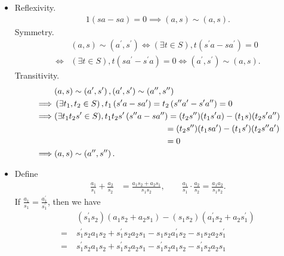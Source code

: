 \begin{solution}
    \begin{itemize}
        \item Reflexivity. 
        \begin{align*}
            1(sa-sa)=0\implies (a,s)\sim(a,s).
        \end{align*}
        Symmetry.
        \begin{align*}
            &(a, s) \sim\left(a^{\prime}, s^{\prime}\right) \Longleftrightarrow\left(\exists t \in S\right), t\left(s^{\prime} a-s a^{\prime}\right)=0 \\
            \iff&  (\exists t \in S), t\left(s a^{\prime}-s^{\prime} a\right)=0\iff \left(a^{\prime}, s^{\prime}\right)  \sim (a, s).
        \end{align*}
        Transitivity.
        \begin{align*}
            &(a, s) \sim\left(a^{\prime}, s^{\prime}\right) ,\left(a^{\prime}, s^{\prime}\right) \sim \left(a'', s''\right)\\
            \implies &\left(\exists t_1,t_2 \in S\right), t_1\left(s^{\prime} a-s a^{\prime}\right)=t_2\left(s'' a'-s' a''\right)=0  \\
            \implies & (\exists t_1t_2s' \in S), t_1t_2s'\left(s'' a-s a''\right)=(t_2s'')(t_1s'a)-(t_1s)(t_2s'a'')\\
            &\hspace{13.25em}=(t_2s'')(t_1sa')-(t_1s')(t_2s'' a')\\
            &\hspace{13.25em}=0\\
            \implies & (a, s)\sim \left(a'', s''\right) .
        \end{align*}
        \item Define
        \begin{align*}
            \frac{a_1}{s_1}+\frac{a_2}{s_2}&=\frac{a_1s_2+a_2s_1}{s_1s_2},\qquad \frac{a_1}{s_1}\cdot\frac{a_2}{s_2}=\frac{a_1a_2}{s_1s_2}.
        \end{align*}
        If $\frac{a_1}{s_1} = \frac{a_1^\prime}{s_1^\prime}$, then we have
        \begin{align*}
            &\;(s_1^\prime s_2)(a_1s_2+a_2s_1)-(s_1s_2)(a_1^\prime s_2+a_2s_1^\prime)\\
            =&\;s_1^\prime s_2a_1s_2+s_1^\prime s_2a_2s_1-s_1s_2a_1^\prime s_2-s_1s_2a_2s_1^\prime\\
            =&\;s_1^\prime s_2a_1s_2+s_1^\prime s_2a_2s_1-s_1^\prime s_2a_1 s_2-s_1^\prime s_2a_2s_1\\

\end{align*}
\end{itemize}
\end{solution}
